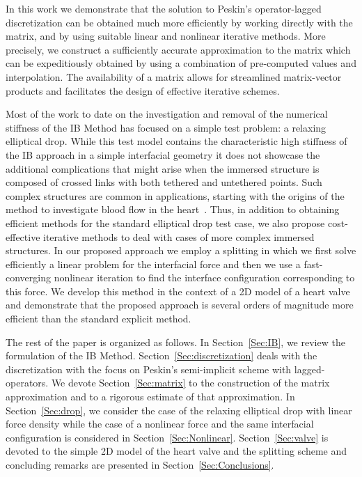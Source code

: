 \documentclass[preprint,12pt]{elsarticle}
\begin{document}
In this work  we demonstrate that the solution to Peskin's operator-lagged discretization
can be obtained much more efficiently by working directly with the matrix, and by using suitable linear and nonlinear iterative methods. More precisely, we construct a sufficiently accurate approximation to the matrix which can
be expeditiously obtained by using a combination of pre-computed values and interpolation.   The availability  of a matrix allows 
for streamlined matrix-vector products and facilitates the design of effective iterative schemes.  

 Most of the work to date on the investigation and removal of the numerical stiffness of the IB Method has focused on a simple test problem: a relaxing elliptical drop.
While this test model contains the characteristic high stiffness of the IB approach in a simple interfacial geometry it does not showcase the additional complications that might arise when the immersed structure is composed of crossed links with both tethered and untethered points. Such complex structures are common in applications, starting with the origins of the method to investigate blood
flow in the heart~\cite{Peskin77}.  Thus, in addition  to obtaining efficient methods for 
the standard elliptical drop test case, we also propose cost-effective iterative methods to deal with cases of more complex immersed structures. In our proposed approach
we employ  a splitting in which we first solve efficiently a linear problem for the interfacial force and then we use a fast-converging nonlinear iteration to find the interface configuration corresponding to this force.  We develop this method in the context of a 2D
model of a heart valve and demonstrate that the proposed approach is several orders of magnitude more efficient than the standard explicit method. 
 
 The rest of the paper is organized as follows. In Section~\ref{Sec:IB}, we review the formulation of the IB Method. Section~\ref{Sec:discretization} deals with the discretization with the focus on  Peskin's semi-implicit scheme with lagged-operators. We devote Section~\ref{Sec:matrix} to the construction of the matrix approximation and     to a rigorous estimate of that approximation.
 In Section~\ref{Sec:drop}, we consider the case of the relaxing elliptical drop with linear force density while the case of 
 a nonlinear force and the same interfacial configuration is considered in Section~\ref{Sec:Nonlinear}. 
 Section~\ref{Sec:valve} is devoted to the simple 2D model of the heart valve and the splitting scheme and concluding remarks are presented in Section~\ref{Sec:Conclusions}.
\end{document}
